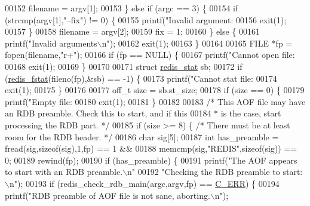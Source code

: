 \begin{DoxyCode}
{{{{{{00152         filename = argv[1];
00153     \} \textcolor{keywordflow}{else} \textcolor{keywordflow}{if} (argc == 3) \{
00154         \textcolor{keywordflow}{if} (strcmp(argv[1],\textcolor{stringliteral}{"--fix"}) != 0) \{
00155             printf(\textcolor{stringliteral}{"Invalid argument: %
00156             exit(1);
00157         \}
00158         filename = argv[2];
00159         fix = 1;
00160     \} \textcolor{keywordflow}{else} \{
00161         printf(\textcolor{stringliteral}{"Invalid arguments\(\backslash\)n"});
00162         exit(1);
00163     \}
00164 
00165     FILE *fp = fopen(filename,\textcolor{stringliteral}{"r+"});
00166     \textcolor{keywordflow}{if} (fp == NULL) \{
00167         printf(\textcolor{stringliteral}{"Cannot open file: %
00168         exit(1);
00169     \}
00170 
00171     \textcolor{keyword}{struct} \hyperlink{config_8h_ae18037d20ab1bc7c716ea0bcb506f7af}{redis\_stat} sb;
00172     \textcolor{keywordflow}{if} (\hyperlink{config_8h_a7fb7329d05a6b4d1b1e7a3fac44c0668}{redis\_fstat}(fileno(fp),&sb) == -1) \{
00173         printf(\textcolor{stringliteral}{"Cannot stat file: %
00174         exit(1);
00175     \}
00176 
00177     off\_t size = sb.st\_size;
00178     \textcolor{keywordflow}{if} (size == 0) \{
00179         printf(\textcolor{stringliteral}{"Empty file: %
00180         exit(1);
00181     \}
00182 
00183     \textcolor{comment}{/* This AOF file may have an RDB preamble. Check this to start, and if this}
00184 \textcolor{comment}{     * is the case, start processing the RDB part. */}
00185     \textcolor{keywordflow}{if} (size >= 8) \{    \textcolor{comment}{/* There must be at least room for the RDB header. */}
00186         \textcolor{keywordtype}{char} sig[5];
00187         \textcolor{keywordtype}{int} has\_preamble = fread(sig,\textcolor{keyword}{sizeof}(sig),1,fp) == 1 &&
00188                             memcmp(sig,\textcolor{stringliteral}{"REDIS"},\textcolor{keyword}{sizeof}(sig)) == 0;
00189         rewind(fp);
00190         \textcolor{keywordflow}{if} (has\_preamble) \{
00191             printf(\textcolor{stringliteral}{"The AOF appears to start with an RDB preamble.\(\backslash\)n"}
00192                    \textcolor{stringliteral}{"Checking the RDB preamble to start:\(\backslash\)n"});
00193             \textcolor{keywordflow}{if} (redis\_check\_rdb\_main(argc,argv,fp) == \hyperlink{server_8h_af98ac28d5f4d23d7ed5985188e6fb7d1}{C\_ERR}) \{
00194                 printf(\textcolor{stringliteral}{"RDB preamble of AOF file is not sane, aborting.\(\backslash\)n"});
}}}}}}}}}}
\end{DoxyCode}
